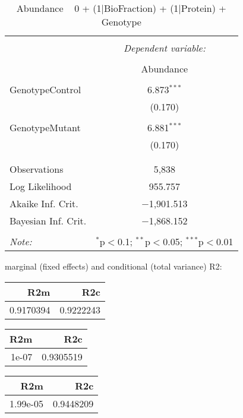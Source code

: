 \documentclass[11pt]{report}
\begin{document}
\begin{table}[!htbp] \centering 
  \caption{Abundance ~ 0 + (1|BioFraction) + (1|Protein) + Genotype} 
  \label{} 
\begin{tabular}{@{\extracolsep{5pt}}lc} 
\\[-1.8ex]\hline 
\hline \\[-1.8ex] 
 & \multicolumn{1}{c}{\textit{Dependent variable:}} \\ 
\cline{2-2} 
\\[-1.8ex] & Abundance \\ 
\hline \\[-1.8ex] 
 GenotypeControl & 6.873$^{***}$ \\ 
  & (0.170) \\ 
  & \\ 
 GenotypeMutant & 6.881$^{***}$ \\ 
  & (0.170) \\ 
  & \\ 
\hline \\[-1.8ex] 
Observations & 5,838 \\ 
Log Likelihood & 955.757 \\ 
Akaike Inf. Crit. & $-$1,901.513 \\ 
Bayesian Inf. Crit. & $-$1,868.152 \\ 
\hline 
\hline \\[-1.8ex] 
\textit{Note:}  & \multicolumn{1}{r}{$^{*}$p$<$0.1; $^{**}$p$<$0.05; $^{***}$p$<$0.01} \\ 
\end{tabular} 
\end{table} 
marginal (fixed effects) and conditional (total variance) R2:

\begin{tabular}{r|r}
\hline
R2m & R2c\\
\hline
0.9170394 & 0.9222243\\
\hline
\end{tabular}

\begin{tabular}{r|r}
\hline
R2m & R2c\\
\hline
1e-07 & 0.9305519\\
\hline
\end{tabular}

\begin{tabular}{r|r}
\hline
R2m & R2c\\
\hline
1.99e-05 & 0.9448209\\
\hline
\end{tabular}
\end{document}
